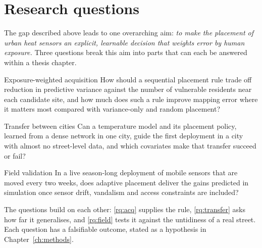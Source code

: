 \chapter{Research questions}\label{ch:questions}

The gap described above leads to one overarching aim: \emph{to make the
placement of urban heat sensors an explicit, learnable decision that
weights error by human exposure.} Three questions break this aim into
parts that can each be answered within a thesis chapter.

\begin{researchquestion}{Exposure-weighted acquisition}\label{rq:acq}
How should a sequential placement rule trade off reduction in predictive
variance against the number of vulnerable residents near each candidate
site, and how much does such a rule improve mapping error where it
matters most compared with variance-only and random placement?
\end{researchquestion}

\begin{researchquestion}{Transfer between cities}\label{rq:transfer}
Can a temperature model and its placement policy, learned from a dense
network in one city, guide the first deployment in a city with almost
no street-level data, and which covariates make that transfer succeed
or fail?
\end{researchquestion}

\begin{researchquestion}{Field validation}\label{rq:field}
In a live season-long deployment of mobile sensors that are moved every
two weeks, does adaptive placement deliver the gains predicted in
simulation once sensor drift, vandalism and access constraints are
included?
\end{researchquestion}

The questions build on each other: \ref{rq:acq} supplies the rule,
\ref{rq:transfer} asks how far it generalises, and \ref{rq:field} tests
it against the untidiness of a real street. Each question has a
falsifiable outcome, stated as a hypothesis in Chapter~\ref{ch:methods}.
